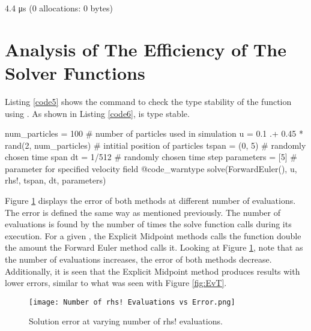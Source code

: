 \documentclass{article}
\begin{document}
{\LARGE
\begin{jllisting}[caption={Type stable check output.}, label=code4]
4.4 μs (0 allocations: 0 bytes)
\end{jllisting}
}

\section{Analysis of The Efficiency of The Solver Functions}

Listing \ref{code5} shows the command to check the type stability of the  function using . As shown in Listing \ref{code6},  is type stable.

{\LARGE
\begin{jllisting}[caption={Type stable check command.}, label=code5]
num_particles = 100 # number of particles used in simulation
u = 0.1 .+ 0.45 * rand(2, num_particles) # intitial position of particles
tspan = (0, 5) # randomly chosen time span
dt = 1/512 # randomly chosen time step
parameters = [5] # parameter for specified velocity field
@code_warntype solve(ForwardEuler(), u, rhs!, tspan, dt, parameters)
\end{jllisting}
}

{\LARGE
{}
}

Figure \ref{fig:EvN} displays the error of both methods at different number of  evaluations. The error is defined the same way as mentioned previously. The number of  evaluations is found by the number of times the solve function calls  during its execution. For a given , the Explicit Midpoint methods calls the  function double the amount the Forward Euler method calls it. Looking at Figure \ref{fig:EvN}, note that as the number of  evaluations increases, the error of both methods decrease. Additionally, it is seen that the Explicit Midpoint method produces results with lower errors, similar to what was seen with Figure \ref{fig:EvT}.

\begin{figure}[h!]
  \centering
  \texttt{[image: Number of rhs! Evaluations vs Error.png]}
  \caption{Solution error at varying number of rhs! evaluations.}
  \label{fig:EvN}
\end{figure}
\end{document}

